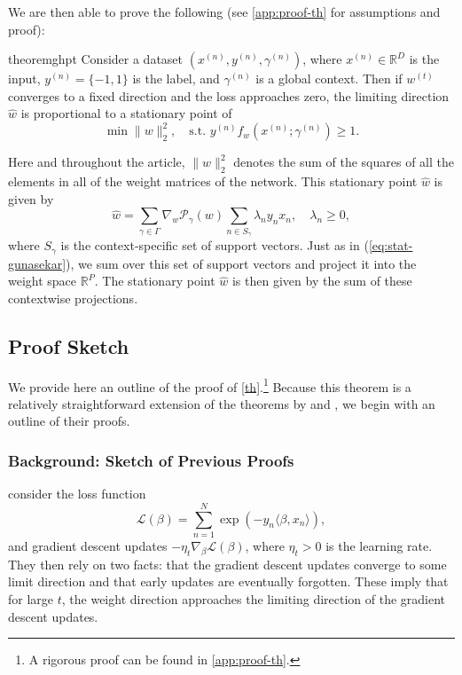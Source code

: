 \documentclass{article}
\theoremstyle{plain}
\theoremstyle{definition}
\theoremstyle{remark}
\begin{document}
We are then able to prove the following (see \cref{app:proof-th} for assumptions and proof):
\begin{restatable}{theorem}{ghpt}
\label{th}
Consider a dataset $(x^{(n)},y^{(n)},\gamma^{(n)})$, where $x^{(n)}\in\mathbb{R}^D$ is the input, $y^{(n)}=\{-1,1\}$ is the label, and $\gamma^{(n)}$ is a global context. Then if $w^{(t)}$ converges to a fixed direction and the loss approaches zero, the limiting direction $\hat{w}$ is proportional to a stationary point of
\begin{equation}
\label{eq:th}
    \min\|w\|_2^2,\quad\text{s.t. }y^{(n)}f_w(x^{(n)};\gamma^{(n)})\geq1.
\end{equation}
\end{restatable}
Here and throughout the article, $\|w\|_2^2$ denotes the sum of the squares of all the elements in all of the weight matrices of the network.
This stationary point $\hat{w}$ is given by
\begin{equation}
\label{eq:th-stat}
    \hat{w}=\sum_{\gamma\in\Gamma}\nabla_w\mathcal{P}_{\gamma}(w)\sum_{n\in S_{\gamma}}\lambda_ny_nx_n,\quad
    \lambda_n\geq 0,
\end{equation}
where $S_{\gamma}$ is the context-specific set of support vectors. Just as in (\ref{eq:stat-gunasekar}), we sum over this set of support vectors and project it into the weight space $\mathbb{R}^P$.
The stationary point $\hat{w}$ is then given by the sum of these contextwise projections.

\subsection{Proof Sketch}
We provide here an outline of the proof of \cref{th}.\footnote{A rigorous proof can be found in \cref{app:proof-th}.}
Because this theorem is a relatively straightforward extension of the theorems by \citet{soudry_implicit_2018} and \citet{gunasekar_implicit_2018}, we begin with an outline of their proofs.

\subsubsection{Background: Sketch of Previous Proofs}

\citet{soudry_implicit_2018} consider the loss function
\begin{equation}
\label{eq:exp-loss}
    \mathcal{L}(\beta)=\sum_{n=1}^N\exp(-y_n\langle\beta,x_n\rangle),
\end{equation}
and gradient descent updates $-\eta_t\nabla_{\beta}\mathcal{L}(\beta)$,
where $\eta_t>0$ is the learning rate.
They then rely on two facts: that the gradient descent updates converge to some limit direction and that early updates are eventually forgotten. These imply that for large $t$, the weight direction approaches the limiting direction of the gradient descent updates.
\end{document}
